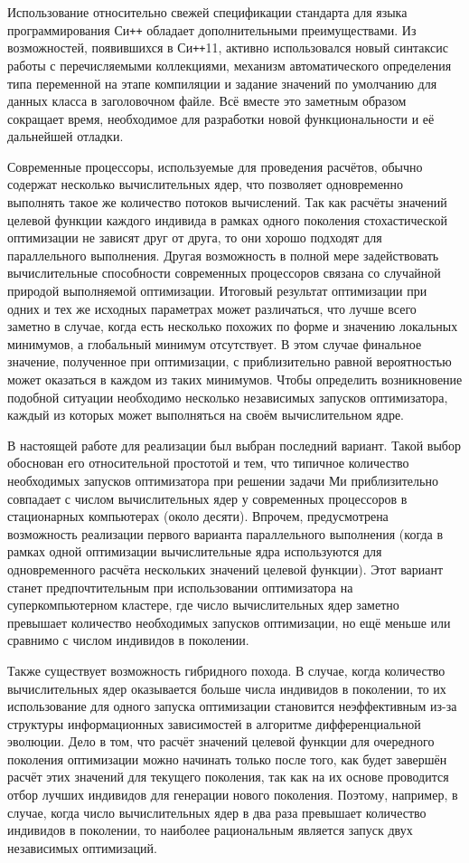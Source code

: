 Использование относительно свежей спецификации стандарта для языка
программирования Си\texttt{++} обладает дополнительными
преимуществами. Из возможностей, появившихся в Си\texttt{++}11,
активно использовался новый синтаксис работы с перечисляемыми
коллекциями, механизм автоматического определения типа переменной на
этапе компиляции и 
задание значений по умолчанию для данных класса в
заголовочном файле. Всё вместе это заметным образом сокращает время,
необходимое для разработки новой функциональности и её дальнейшей отладки.

Современные процессоры, используемые для проведения расчётов, обычно
 содержат несколько вычислительных ядер, что позволяет
одновременно выполнять такое же количество потоков вычислений. Так как расчёты
значений целевой функции каждого индивида в рамках одного
поколения стохастической оптимизации не зависят друг от друга, то они
хорошо подходят для параллельного выполнения. Другая возможность в
полной мере задействовать вычислительные способности современных
процессоров связана со случайной природой выполняемой
оптимизации. Итоговый результат оптимизации при одних и тех же
исходных параметрах может различаться, что лучше всего заметно в
случае, когда есть несколько похожих по форме и значению локальных
минимумов, а глобальный минимум отсутствует. В этом случае финальное
значение, полученное при оптимизации, с приблизительно равной
вероятностью может оказаться в каждом из таких минимумов. Чтобы
определить возникновение подобной ситуации необходимо несколько
независимых запусков оптимизатора, каждый из которых может выполняться
на своём вычислительном ядре.

В настоящей работе для реализации был выбран последний вариант. Такой
выбор обоснован его относительной простотой и тем, что типичное
количество необходимых запусков оптимизатора при решении
задачи Ми приблизительно совпадает с числом вычислительных ядер у
современных процессоров в стационарных компьютерах (около
десяти). Впрочем, предусмотрена возможность реализации первого
варианта параллельного выполнения (когда в рамках одной оптимизации
вычислительные ядра используются для одновременного расчёта
нескольких значений целевой функции). Этот вариант станет предпочтительным
при использовании оптимизатора на суперкомпьютерном кластере, где число
вычислительных ядер заметно превышает количество необходимых запусков
оптимизации, но ещё меньше или сравнимо с числом индивидов в поколении.

Также существует возможность гибридного похода. В случае, когда
количество вычислительных ядер оказывается больше числа индивидов в
поколении, то их использование для одного запуска оптимизации
становится неэффективным из-за структуры информационных зависимостей в
алгоритме дифференциальной эволюции. Дело в том, что расчёт значений
целевой функции для очередного поколения оптимизации можно начинать
только после того, как будет завершён расчёт этих значений для
текущего поколения, так как на их основе проводится отбор лучших индивидов
для генерации нового поколения. Поэтому,
например, в случае, когда число вычислительных ядер в два раза
превышает количество индивидов в поколении, то наиболее рациональным
является запуск двух независимых оптимизаций.

